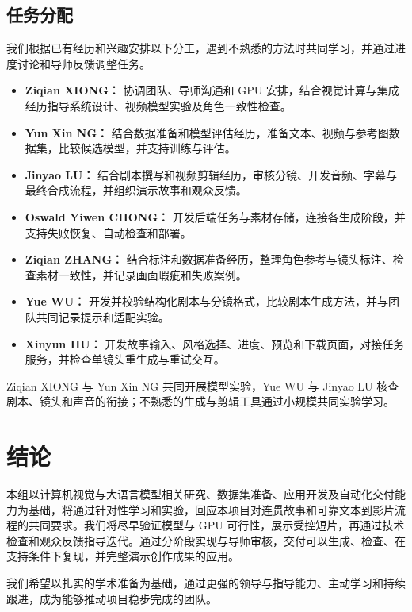 \documentclass[a4paper,12pt]{article}
\begin{document}
\clearpage

\subsection{任务分配}
我们根据已有经历和兴趣安排以下分工，遇到不熟悉的方法时共同学习，并通过进度讨论和导师反馈调整任务。
\begin{itemize}
  \item \textbf{Ziqian XIONG：} 协调团队、导师沟通和 GPU 安排，结合视觉计算与集成经历指导系统设计、视频模型实验及角色一致性检查。
  \item \textbf{Yun Xin NG：} 结合数据准备和模型评估经历，准备文本、视频与参考图数据集，比较候选模型，并支持训练与评估。
  \item \textbf{Jinyao LU：} 结合剧本撰写和视频剪辑经历，审核分镜、开发音频、字幕与最终合成流程，并组织演示故事和观众反馈。
  \item \textbf{Oswald Yiwen CHONG：} 开发后端任务与素材存储，连接各生成阶段，并支持失败恢复、自动检查和部署。
  \item \textbf{Ziqian ZHANG：} 结合标注和数据准备经历，整理角色参考与镜头标注、检查素材一致性，并记录画面瑕疵和失败案例。
  \item \textbf{Yue WU：} 开发并校验结构化剧本与分镜格式，比较剧本生成方法，并与团队共同记录提示和适配实验。
  \item \textbf{Xinyun HU：} 开发故事输入、风格选择、进度、预览和下载页面，对接任务服务，并检查单镜头重生成与重试交互。
\end{itemize}

Ziqian XIONG 与 Yun Xin NG 共同开展模型实验，Yue WU 与 Jinyao LU 核查剧本、镜头和声音的衔接；不熟悉的生成与剪辑工具通过小规模共同实验学习。

\clearpage
\section{结论}
本组以计算机视觉与大语言模型相关研究、数据集准备、应用开发及自动化交付能力为基础，将通过针对性学习和实验，回应本项目对连贯故事和可靠文本到影片流程的共同要求。我们将尽早验证模型与 GPU 可行性，展示受控短片，再通过技术检查和观众反馈指导迭代。通过分阶段实现与导师审核，交付可以生成、检查、在支持条件下复现，并完整演示创作成果的应用。

我们希望以扎实的学术准备为基础，通过更强的领导与指导能力、主动学习和持续跟进，成为能够推动项目稳步完成的团队。
\end{document}
